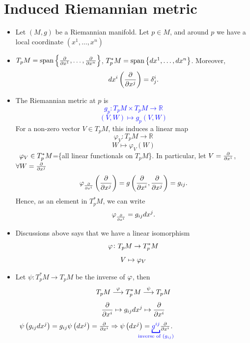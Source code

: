 \section{Induced Riemannian metric}
\begin{itemize}
    \item Let \((M,g)\) be a Riemannian manifold. Let \(p\in M\),
    and around \(p\) we have a local coordinate \((x^1,\ldots,x^n)\)
    \item \(T_p M=\operatorname{span}\left\{
        \pdv{x^1},\ldots,\pdv{x^n}
    \right\}\), \(T^*_p M=\operatorname{span}\left\{
        dx^1,\ldots,dx^n
    \right\}\).
    Moreover, 
    \textcolor{blue}{
        \[
            d x^i\left(\pdv{x^j}\right)=\delta^i_j.    
        \]
    }
    \item The Riemannian metric at \(p\) is
    \textcolor{blue}{
        \[
        g_p\colon T_p M\times T_p M\to \mathbb{R}    
        \]
        \[
            (V,W)\mapsto g_p(V,W)    
        \]
    }
    For a non-zero vector \(V\in T_p M\), this induces a linear map
    \[  
        \varphi_V\colon T_p M\to \mathbb{R}
        \]
\[W\mapsto \varphi_V(W)\]
\ie\ \(\varphi_V\in T^*_p M\)=\{all linear functionals on \(T_p M\)\}.
In particular, let \(V=\pdv{x^i}\), \(\forall W=\pdv{x^j}\)
\[
    \varphi_{\pdv{x^i}}\left(\pdv{x^j}\right)=g\left(\pdv{x^i},
    \pdv{x^j}\right)=g_{ij}.    
\]
Hence, as an element in \(T^*_p M\), we can write
\textcolor{blue}{
    \[\varphi_{\pdv{x^i}}=g_{ij}d x^j.\]
}
\item Discussions above says that we have a linear isomorphism
\[\varphi \colon T_p M\to T^*_p M\]
\[V\mapsto \varphi_V\]
\item Let \(\psi\colon T^*_p M\to T_p M\) be the inverse of \(\varphi\),
then 
\[
    T_p M \overset{\varphi}{\longrightarrow}T^*_p M\overset{\psi}{
        \longrightarrow
    }
    T_p M    
\]
\[
    \pdv{x^i}\mapsto g_{ij}d x^j\mapsto \pdv{x^i}    
\]
\ie\ \(\psi\left(g_{ij}d x^j\right)=g_{ij}\psi\left(d x^j\right)
=\pdv{x^i}\Rightarrow \psi\left(d x^j\right)=\textcolor{blue}{
    \underbracket{g^{ij}}_{\mathclap{\text{inverse of }(g_{ij})}}}
\pdv{x^i}\).


\end{itemize}

